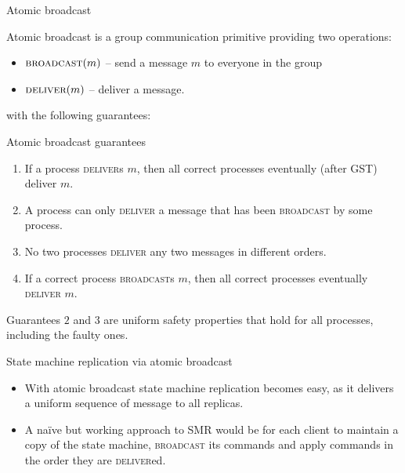 \documentclass{beamer}
\begin{document}
\begin{frame}{Atomic broadcast}
  \begin{definition}
    Atomic broadcast is a group communication primitive providing two operations:
    \begin{itemize}
      \item $\textsc{broadcast}(m)$ -- send a message $m$ to everyone in the group
      \item $\textsc{deliver}(m)$ -- deliver a message.
    \end{itemize}
    with the following guarantees:
  \end{definition}
\end{frame}

\begin{frame}{Atomic broadcast guarantees}
  \begin{enumerate}
    \item If a process \textsc{deliver}s $m$, then all \alert{correct} processes eventually (after GST) deliver $m$.
    \item A process can only \textsc{deliver} a message that has been \textsc{broadcast} by some process.
    \item No two processes \textsc{deliver} any two messages in different orders.
    \item If a correct process \textsc{broadcast}s $m$, then all \alert{correct} processes eventually \textsc{deliver} $m$.
  \end{enumerate}
  Guarantees $2$ and $3$ are \alert{uniform safety} properties that hold for \alert{all} processes, including the faulty ones.
\end{frame}

\begin{frame}{State machine replication via atomic broadcast}
  \begin{itemize}
    \item With atomic broadcast state machine replication becomes easy, as it delivers a uniform sequence of message to all replicas.
    \item A na\"ive but working approach to SMR would be for each client to maintain a copy of the state machine, \textsc{broadcast} its commands and apply commands in the order they are \textsc{deliver}ed.
  \end{itemize}
\end{frame}
\end{document}
